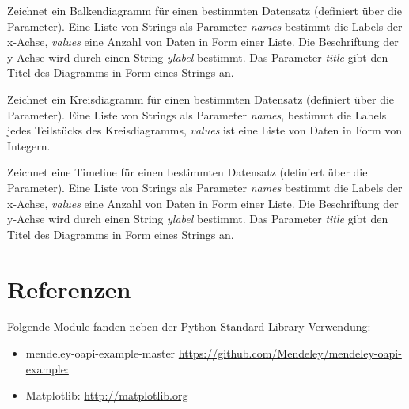 \documentclass[letterpaper,10pt,english]{sphinxmanual}
\begin{document}

\begin{fulllineitems}
\label{project_3:project_3.draw_barchart}
Zeichnet ein Balkendiagramm für einen bestimmten Datensatz (definiert über die Parameter).
Eine Liste von Strings als Parameter \emph{names} bestimmt die Labels der x-Achse, \emph{values} eine Anzahl von Daten in Form einer Liste. Die Beschriftung der y-Achse wird durch einen String \emph{ylabel} bestimmt. Das Parameter \emph{title} gibt den Titel des Diagramms in Form eines Strings an.

\end{fulllineitems}


\begin{fulllineitems}
\label{project_3:project_3.draw_piechart}
Zeichnet ein Kreisdiagramm für einen bestimmten Datensatz (definiert über die Parameter). Eine Liste von Strings als Parameter \emph{names}, bestimmt die Labels jedes Teilstücks des Kreisdiagramms, \emph{values} ist eine Liste von Daten in Form von Integern.

\end{fulllineitems}


\begin{fulllineitems}
\label{project_3:project_3.draw_timeline}
Zeichnet eine Timeline für einen bestimmten Datensatz (definiert über die Parameter).
Eine Liste von Strings als Parameter \emph{names} bestimmt die Labels der x-Achse, \emph{values} eine Anzahl von Daten in Form einer Liste. Die Beschriftung der y-Achse wird durch einen String \emph{ylabel} bestimmt. Das Parameter \emph{title} gibt den Titel des Diagramms in Form eines Strings an.

\end{fulllineitems}



\section{Referenzen}
\label{project_3:referenzen}
Folgende Module fanden neben der Python Standard Library Verwendung:
\begin{itemize}
\item {} 
mendeley-oapi-example-master \href{https://github.com/Mendeley/mendeley-oapi-example/}{https://github.com/Mendeley/mendeley-oapi-example:}

\item {} 
Matplotlib: \href{http://matplotlib.org/}{http://matplotlib.org}

\end{itemize}
\end{document}
